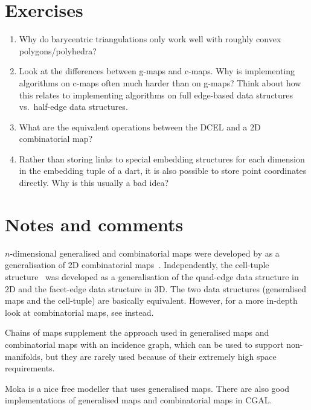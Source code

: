 %
\section{Exercises}

\begin{enumerate}
	\item Why do barycentric triangulations only work well with roughly convex polygons/polyhedra?
	\item Look at the differences between g-maps and c-maps. Why is implementing algorithms on c-maps often much harder than on g-maps? Think about how this relates to implementing algorithms on full edge-based data structures vs.\ half-edge data structures.
	\item What are the equivalent operations between the DCEL and a 2D combinatorial map?
	\item Rather than storing links to special embedding structures for each dimension in the embedding tuple of a dart, it is also possible to store point coordinates directly. Why is this usually a bad idea?
\end{enumerate}



%
\section{Notes and comments}

\(n\)-dimensional generalised and combinatorial maps were developed by \citet{Lienhardt94} as a generalisation of 2D combinatorial maps~\citep{Edmonds60}.
Independently, the cell-tuple structure~\citep{Brisson89} was developed as a generalisation of the quad-edge \citep{Guibas85} data structure in 2D and the facet-edge data structure \citep{Dobkin87} in 3D.
The two data structures (generalised maps and the cell-tuple) are basically equivalent.
However, for a more in-depth look at combinatorial maps, see \citet{Damiand14} instead.

Chains of maps \citep{Elter94} supplement the approach used in generalised maps and combinatorial maps with an incidence graph, which can be used to support non-manifolds, but they are rarely used because of their extremely high space requirements.

Moka is a nice free modeller that uses generalised maps.
There are also good implementations of generalised maps and combinatorial maps in CGAL\@.
